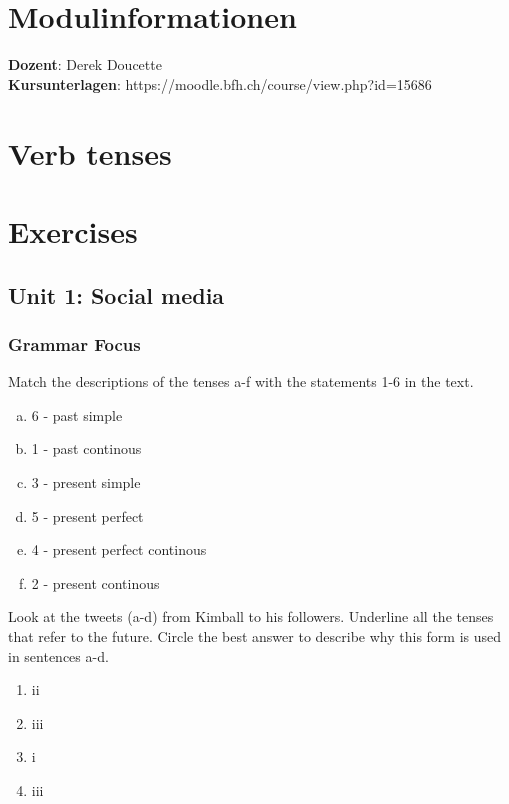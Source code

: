 \documentclass[12pt, a4paper, oneside]{article}
\title{\vspace{-1.5cm}\subjectIdentifier{}\\\subject{}}
\author{\vspace{-1.5cm}}
\date{\vspace{-1.5cm}}
\begin{document}
  \maketitle
  \thispagestyle{fancy}
  
  \section{Modulinformationen}
  {\bf Dozent}: Derek Doucette\\
  {\bf Kursunterlagen}: https://moodle.bfh.ch/course/view.php?id=15686\\
  
  \section{Verb tenses}

  \section{Exercises}
  \subsection{Unit 1: Social media}
  \subsubsection{Grammar Focus}
  
  Match the descriptions of the tenses a-f with the statements 1-6 in the text.
  \begin{enumerate}[a)] 
    \item 6 - past simple
    \item 1 - past continous
    \item 3 - present simple
    \item 5 - present perfect
    \item 4 - present perfect continous
    \item 2 - present continous
  \end{enumerate}

  Look at the tweets (a-d) from Kimball to his followers. Underline all the tenses that refer to the future. Circle the best answer to describe why this form is used in sentences a-d.
  \begin{enumerate}[1.]
    \item ii
    \item iii
    \item i
    \item iii
  \end{enumerate}
\end{document}
